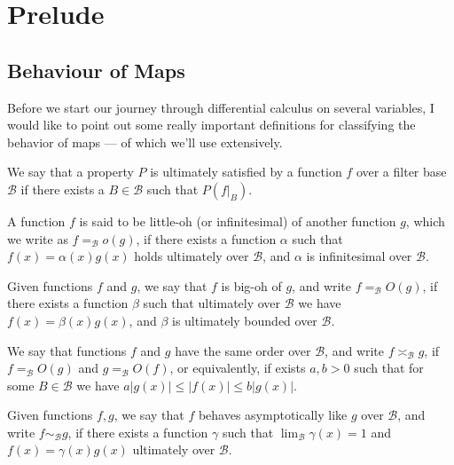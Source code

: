 \section{Prelude}

\subsection{Behaviour of Maps}

Before we start our journey through differential calculus on several variables,
I would like to point out some really important definitions for classifying the
behavior of maps --- of which we'll use extensively.

\begin{definition}[Ultimately]
We say that a property \(P\) is ultimately satisfied by a function \(f\) over
a filter base \(\mathcal B\) if there exists a \(B \in \mathcal B\) such that
\(P(f|_B)\).
\end{definition}

\begin{definition}[Little-oh]\label{def: little oh}
A function \(f\) is said to be little-oh (or infinitesimal) of another
function \(g\), which we write as \(f =_{\mathcal B} o(g)\), if there exists
a function \(\alpha\) such that \(f(x) = \alpha(x) g(x)\) holds ultimately
over \(\mathcal B\), and \(\alpha\) is infinitesimal over \(\mathcal B\).
\end{definition}

\begin{definition}[Big-oh]\label{def: big oh}
Given functions \(f\) and \(g\), we say that \(f\) is big-oh of \(g\), and
write \(f =_{\mathcal B} O(g)\), if there exists a function \(\beta\) such
that ultimately over \(\mathcal B\) we have \(f(x) = \beta(x) g(x)\), and
\(\beta\) is ultimately bounded over \(\mathcal B\).
\end{definition}

\begin{definition}\label{def: asymp-order}
We say that functions \(f\) and \(g\) have the same order over \(\mathcal
B\), and write \(f \asymp_{\mathcal B} g\), if \(f =_{\mathcal B} O(g)\) and
\(g =_{\mathcal B} O(f)\), or equivalently, if exists \(a, b > 0\) such that
for some \(B \in \mathcal B\) we have \(a |g(x)| \leq |f(x)| \leq b|g(x)|\).
\end{definition}

\begin{definition}
Given functions \(f, g\), we say that \(f\) behaves asymptotically like \(g\)
over \(\mathcal B\), and write \(f \sim_{\mathcal B} g\), if there exists a
function \(\gamma\) such that \(\lim_{\mathcal B} \gamma(x) = 1\) and \(f(x) =
\gamma(x) g(x)\) ultimately over \(\mathcal B\).
\end{definition}

